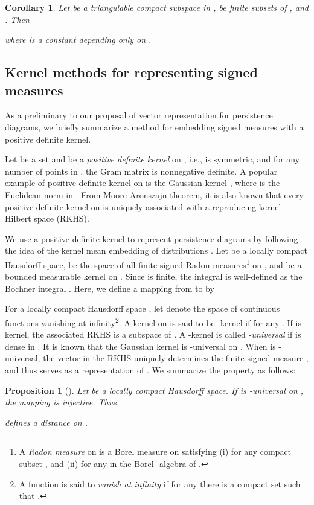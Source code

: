 \documentclass{article}
\newtheorem{prop}[thm]{Proposition}
\newtheorem{cor}[thm]{Corollary}
\begin{document}
\begin{cor}
\label{cor:point_wasserstein}
Let  be a triangulable compact subspace in ,  be finite subsets of , and . Then 

where  is a constant depending only on .
\end{cor}

\subsection{Kernel methods for representing signed measures}
\label{subsec:universal}

As a preliminary to our proposal of vector representation for persistence diagrams, we briefly summarize a method for embedding signed measures with a positive definite kernel.

Let  be a set and  be a {\em positive definite kernel} on , i.e.,  is symmetric, and for any number of points  in , the Gram matrix  is nonnegative definite.
A popular example of positive definite kernel on  is the Gaussian kernel , where  is the Euclidean norm in .
From Moore-Aronszajn theorem, it is also known that every positive definite kernel  on  is uniquely associated with a reproducing kernel Hilbert space  (RKHS).

We use a positive definite kernel to represent persistence diagrams by following the idea of the kernel mean embedding of distributions \cite{MFSS17, SGSS07,SFL11}.
Let  be a locally compact Hausdorff space,  be the space of all finite signed Radon measures\footnote{A {\em Radon measure}  on  is a Borel measure on  satisfying
(i)  for any compact subset , and 
(ii)  for any  in the Borel -algebra of .} on , and  be a bounded measurable kernel on .
Since  is finite, the integral  is well-defined as the Bochner integral \cite{DU77}.
Here, we define a mapping from  to  by


For a locally compact Hausdorff space , let  denote the space of continuous functions vanishing at infinity\footnote{A function  is said to {\em vanish at infinity} if for any  there is a compact set  such that .}.
A kernel  on  is said to be -kernel if  for any .
If  is -kernel, the associated RKHS  is a subspace of .
A -kernel  is called {\em -universal} if  is dense in .
It is known that the Gaussian kernel  is -universal on  \cite{SFL11}.
When  is -universal, the vector  in the RKHS uniquely determines the finite signed measure , and thus serves as a representation of . We summarize the property as follows:
\begin{prop}[\cite{SFL11}]
\label{prop:C0_distance}
Let  be a locally compact Hausdorff space.
If  is -universal on , the mapping  is injective. Thus,

defines a distance on .
\end{prop}
\end{document}
